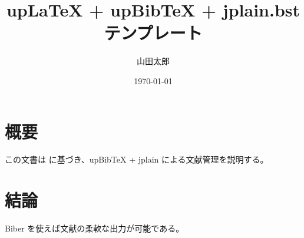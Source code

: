 \documentclass[uplatex]{jsarticle}
\title{upLaTeX + upBibTeX + jplain.bst テンプレート}
\author{山田太郎}
\date{\today}
\begin{document}
\maketitle

\section*{概要}
この文書は\cite{fujita2020} に基づき、upBibTeX + jplain による文献管理を説明する。

\section*{結論}
Biber を使えば文献の柔軟な出力が可能である。



\end{document}
